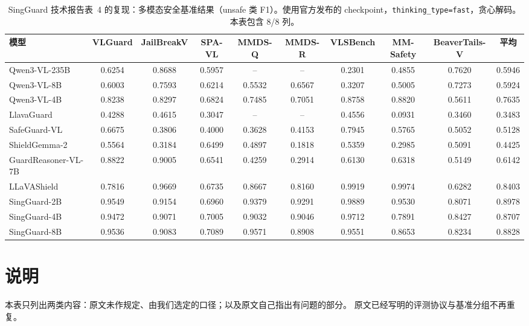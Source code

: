 \documentclass[10pt]{article}
\begin{document}
\begin{table}[t]\centering
\caption{SingGuard 技术报告表~4 的复现：多模态安全基准结果（unsafe 类 F1）。使用官方发布的 checkpoint，\texttt{thinking\_type=fast}，贪心解码。本表包含 8/8 列。}
\label{tab:table4-repro}
\begin{tabular}{lccccccccc}\toprule
\rowcolor{headbg} 模型 & VLGuard & JailBreakV & SPA-VL & MMDS-Q & MMDS-R & VLSBench & MM-Safety & BeaverTails-V & 平均 \\\midrule
Qwen3-VL-235B & 0.6254 & 0.8688 & 0.5957 & -- & -- & 0.2301 & 0.4855 & 0.7620 & 0.5946 \\
\rowcolor{rowbg} Qwen3-VL-8B & 0.6003 & 0.7593 & 0.6214 & 0.5532 & 0.6567 & 0.3207 & 0.5005 & 0.7273 & 0.5924 \\
Qwen3-VL-4B & 0.8238 & 0.8297 & 0.6824 & 0.7485 & 0.7051 & 0.8758 & 0.8820 & 0.5611 & 0.7635 \\
\rowcolor{rowbg} LlavaGuard & 0.4288 & 0.4615 & 0.3047 & -- & -- & 0.4556 & 0.0931 & 0.3460 & 0.3483 \\
SafeGuard-VL & 0.6675 & 0.3806 & 0.4000 & 0.3628 & 0.4153 & 0.7945 & 0.5765 & 0.5052 & 0.5128 \\
\rowcolor{rowbg} ShieldGemma-2 & 0.5564 & 0.3184 & 0.6499 & 0.4897 & 0.1818 & 0.5359 & 0.2985 & 0.5091 & 0.4425 \\
GuardReasoner-VL-7B & 0.8822 & 0.9005 & 0.6541 & 0.4259 & 0.2914 & 0.6130 & 0.6318 & 0.5149 & 0.6142 \\
\rowcolor{rowbg} LLaVAShield & 0.7816 & 0.9669 & 0.6735 & 0.8667 & 0.8160 & 0.9919 & 0.9974 & 0.6282 & 0.8403 \\
SingGuard-2B & 0.9549 & 0.9154 & 0.6960 & 0.9379 & 0.9291 & 0.9889 & 0.9530 & 0.8071 & 0.8978 \\
\rowcolor{rowbg} SingGuard-4B & 0.9472 & 0.9071 & 0.7005 & 0.9032 & 0.9046 & 0.9712 & 0.7891 & 0.8427 & 0.8707 \\
SingGuard-8B & 0.9536 & 0.9083 & 0.7089 & 0.9571 & 0.8908 & 0.9551 & 0.8653 & 0.8234 & 0.8828 \\
\bottomrule\end{tabular}\end{table}

\section*{说明}
本表只列出两类内容：原文未作规定、由我们选定的口径；以及原文自己指出有问题的部分。
原文已经写明的评测协议与基准分组不再重复。
\end{document}
